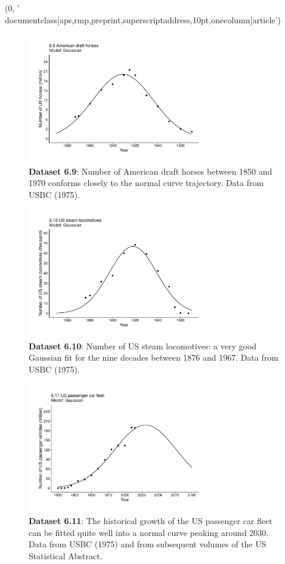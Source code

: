 (0, '\\documentclass[aps,rmp,preprint,superscriptaddress,10pt,onecolumn]{article}\n')
\begin{document}
\begin{figure}[h]
\includegraphics[width=8cm]{output/figs-ggplot/6.9.pdf}
\caption{\textbf{Dataset 6.9}: Number of American draft horses between 1850 and 1970 conforms closely to the normal curve trajectory. Data from USBC (1975). }
\end{figure}
	
\begin{figure}[h]
\includegraphics[width=8cm]{output/figs-ggplot/6.10.pdf}
\caption{\textbf{Dataset 6.10}: Number of US steam locomotives: a very good Gaussian fit for the nine decades between 1876 and 1967. Data from USBC (1975). }
\end{figure}
	
\begin{figure}[h]
\includegraphics[width=8cm]{output/figs-ggplot/6.11.pdf}
\caption{\textbf{Dataset 6.11}: The historical growth of the US passenger car fleet can be fitted quite well into a normal curve peaking around 2030. Data from USBC (1975) and from subsequent volumes of the US Statistical Abstract. }
\end{figure}
	
\end{document}
